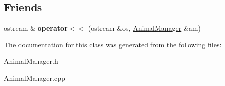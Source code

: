 \subsection*{Friends}
\begin{DoxyCompactItemize}
\item 
\mbox{\label{class_animal_manager_aec1739a2a9aeb553d1408cb0b93c096d}} 
ostream \& {\bfseries operator$<$$<$} (ostream \&os, \hyperlink{class_animal_manager}{Animal\+Manager} \&am)
\end{DoxyCompactItemize}


The documentation for this class was generated from the following files\+:\begin{DoxyCompactItemize}
\item 
Animal\+Manager.\+h\item 
Animal\+Manager.\+cpp\end{DoxyCompactItemize}
